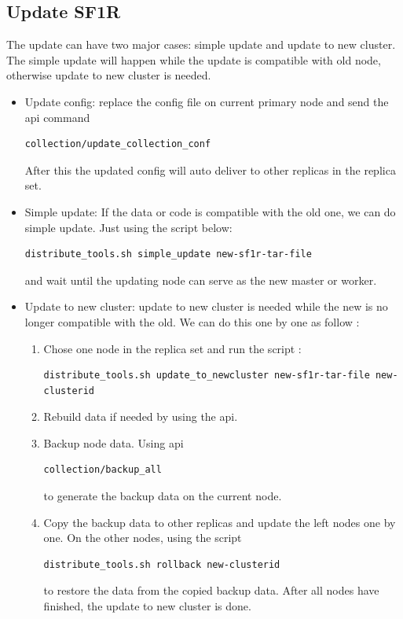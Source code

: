 \subsection{Update SF1R}
The update can have two major cases: simple update and update to new cluster. The simple update will happen while the update is compatible with old node, otherwise update to new cluster is needed.
\begin{itemize}
\item Update config: replace the config file on current primary node and send the api command
\begin{lstlisting}
collection/update_collection_conf 
\end{lstlisting}
After this the updated config will auto deliver to other replicas in the replica set.
\item Simple update: If the data or code is compatible with the old one, we can do simple update. Just using the script below:
\begin{lstlisting}
distribute_tools.sh simple_update new-sf1r-tar-file
\end{lstlisting}
and wait until the updating node can serve as the new master or worker.

\item Update to new cluster: update to new cluster is needed while the new is no longer compatible with the old. We can do this one by one as follow : 
\begin{enumerate}

\item Chose one node in the replica set and run the script :
\begin{lstlisting}
distribute_tools.sh update_to_newcluster new-sf1r-tar-file new-clusterid
\end{lstlisting}
\item Rebuild data if needed by using the api.
\item Backup node data. Using api
\begin{lstlisting}
collection/backup_all
\end{lstlisting}
to generate the backup data on the current node.
\item Copy the backup data to other replicas and update the left nodes one by one. On the other nodes, using the script 
\begin{lstlisting}
distribute_tools.sh rollback new-clusterid
\end{lstlisting}
to restore the data from the copied backup data. After all nodes have finished, the update to new cluster is done.

\end{enumerate}
\end{itemize}
